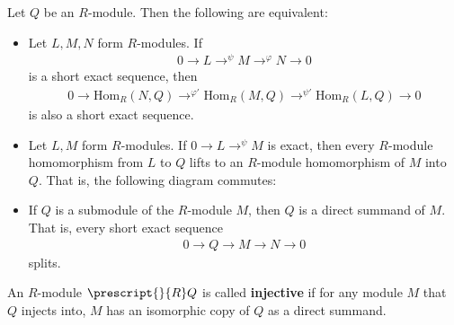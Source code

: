 \documentclass{memoir}
\begin{document}
\begin{prop}
	Let \(Q\) be an \(R\)-module. Then the following are equivalent:
	\begin{itemize}
		\item Let \(L,M,N\) form \(R\)-modules. If
			\begin{align*}
				0 \to L \to^{\psi }M \to^{\varphi }N \to 0
			\end{align*}
			is a short exact sequence, then
			\begin{align*}
				0 \to \textrm{Hom}_R(N,Q) \to^{\varphi '} \textrm{Hom}_R(M,Q) \to^{\psi '} \textrm{Hom}_R(L,Q) \to 0
			\end{align*}
			is also a short exact sequence.
		\item Let \(L,M\) form \(R\)-modules. If \(0 \to L\to^{\psi }M\) is exact, then every \(R\)-module homomorphism from \(L\) to \(Q\) lifts to an \(R\)-module homomorphism of \(M\) into \(Q\). That is, the following diagram commutes:
\begin{center}
\end{center}
\item If \(Q\) is a submodule of the \(R\)-module \(M\), then \(Q\) is a direct summand of \(M\). That is, every short exact sequence
	\begin{align*}
		0 \to Q \to M \to N \to 0
	\end{align*}
	splits.
	\end{itemize}
\end{prop}

\begin{defn}
	An \(R\)-module \(\prescript{}{R}Q\) is called \textbf{injective} if for any module \(M\) that \(Q\) injects into, \(M\) has an isomorphic copy of \(Q\) as a direct summand.
\end{defn}

\begin{exmp}
		
\end{exmp}
\end{document}
